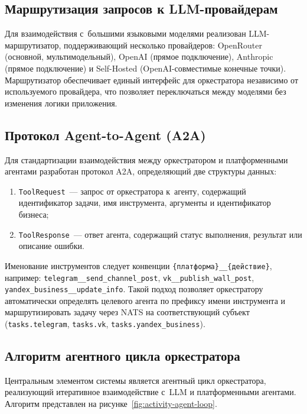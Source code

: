 \subsection{Маршрутизация запросов к LLM-провайдерам}
\label{subsec:llm-router}

Для взаимодействия с~большими языковыми моделями реализован LLM-маршрутизатор, поддерживающий несколько провайдеров: OpenRouter (основной, мультимодельный), OpenAI (прямое подключение), Anthropic (прямое подключение) и Self-Hosted (OpenAI-совместимые конечные точки). Маршрутизатор обеспечивает единый интерфейс для оркестратора независимо от используемого провайдера, что позволяет переключаться между моделями без изменения логики приложения.

\subsection{Протокол Agent-to-Agent (A2A)}
\label{subsec:a2a-impl}

Для стандартизации взаимодействия между оркестратором и платформенными агентами разработан протокол A2A, определяющий две структуры данных:

\begin{enumerate}
  \item \texttt{ToolRequest}~--- запрос от оркестратора к~агенту, содержащий идентификатор задачи, имя инструмента, аргументы и идентификатор бизнеса;
  \item \texttt{ToolResponse}~--- ответ агента, содержащий статус выполнения, результат или описание ошибки.
\end{enumerate}

Именование инструментов следует конвенции \texttt{\{платформа\}\_\_\{действие\}}, например: \texttt{telegram\_\_send\_channel\_post}, \texttt{vk\_\_publish\_wall\_post}, \texttt{yandex\_business\_\_update\_info}. Такой подход позволяет оркестратору автоматически определять целевого агента по префиксу имени инструмента и маршрутизировать задачу через NATS на соответствующий субъект (\texttt{tasks.telegram}, \texttt{tasks.vk}, \texttt{tasks.yandex\_business}).

\subsection{Алгоритм агентного цикла оркестратора}
\label{subsec:agent-loop}

Центральным элементом системы является агентный цикл оркестратора, реализующий итеративное взаимодействие с~LLM и платформенными агентами. Алгоритм представлен на рисунке~\ref{fig:activity-agent-loop}.

